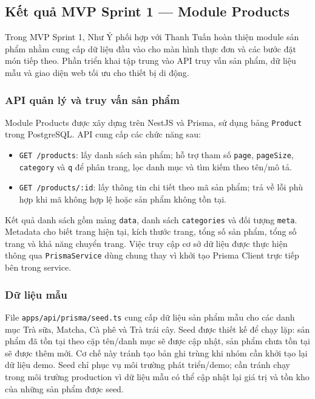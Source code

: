 \subsection{Kết quả MVP Sprint 1 — Module Products}

Trong MVP Sprint 1, Như Ý phối hợp với Thanh Tuấn hoàn thiện module sản phẩm nhằm cung cấp dữ liệu đầu vào cho màn hình thực đơn và các bước đặt món tiếp theo. Phần triển khai tập trung vào API truy vấn sản phẩm, dữ liệu mẫu và giao diện web tối ưu cho thiết bị di động.

\subsubsection{API quản lý và truy vấn sản phẩm}

Module Products được xây dựng trên NestJS và Prisma, sử dụng bảng \texttt{Product} trong PostgreSQL. API cung cấp các chức năng sau:
\begin{itemize}
    \item \texttt{GET /products}: lấy danh sách sản phẩm; hỗ trợ tham số \texttt{page}, \texttt{pageSize}, \texttt{category} và \texttt{q} để phân trang, lọc danh mục và tìm kiếm theo tên/mô tả.
    \item \texttt{GET /products/:id}: lấy thông tin chi tiết theo mã sản phẩm; trả về lỗi phù hợp khi mã không hợp lệ hoặc sản phẩm không tồn tại.
\end{itemize}

Kết quả danh sách gồm mảng \texttt{data}, danh sách \texttt{categories} và đối tượng \texttt{meta}. Metadata cho biết trang hiện tại, kích thước trang, tổng số sản phẩm, tổng số trang và khả năng chuyển trang. Việc truy cập cơ sở dữ liệu được thực hiện thông qua \texttt{PrismaService} dùng chung thay vì khởi tạo Prisma Client trực tiếp bên trong service.

\subsubsection{Dữ liệu mẫu}

File \texttt{apps/api/prisma/seed.ts} cung cấp dữ liệu sản phẩm mẫu cho các danh mục Trà sữa, Matcha, Cà phê và Trà trái cây. Seed được thiết kế để chạy lặp: sản phẩm đã tồn tại theo cặp tên/danh mục sẽ được cập nhật, sản phẩm chưa tồn tại sẽ được thêm mới. Cơ chế này tránh tạo bản ghi trùng khi nhóm cần khởi tạo lại dữ liệu demo. Seed chỉ phục vụ môi trường phát triển/demo; cần tránh chạy trong môi trường production vì dữ liệu mẫu có thể cập nhật lại giá trị và tồn kho của những sản phẩm được seed.

